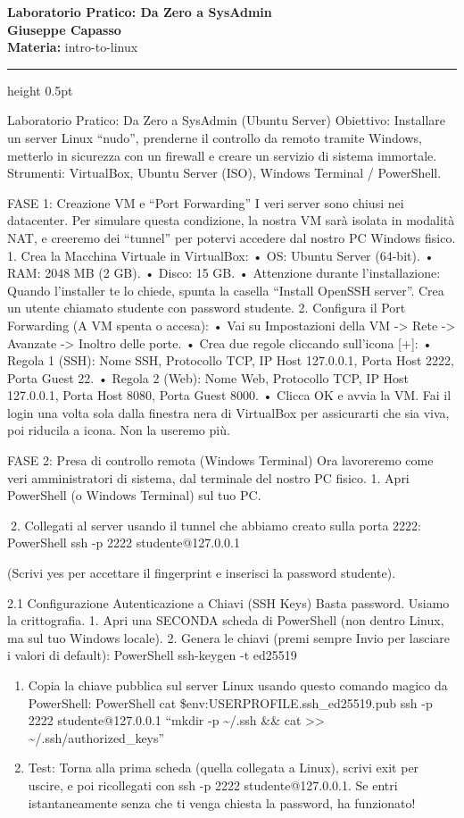 \documentclass[11pt,a4paper]{article}
\newcommand{\proposaltitle}[1]{
    \begin{center}
        \vspace*{0.1cm}
        {\LARGE \bfseries \color{blue} #1} \\[1.5ex]
        {\large \textbf{Giuseppe Capasso}} \\[1ex]
                \small{
            \vspace{0.1cm}
            \textbf{Materia:} intro-to-linux\\
        }
            \end{center}
    \vspace{0.3cm}
    \hrule height 0.5pt
    \vspace{0.5cm}
}
\begin{document}
\proposaltitle{Laboratorio Pratico: Da Zero a SysAdmin}

Laboratorio Pratico: Da Zero a SysAdmin (Ubuntu Server) Obiettivo:
Installare un server Linux ``nudo'', prenderne il controllo da remoto
tramite Windows, metterlo in sicurezza con un firewall e creare un
servizio di sistema immortale. Strumenti: VirtualBox, Ubuntu Server
(ISO), Windows Terminal / PowerShell.

FASE 1: Creazione VM e ``Port Forwarding'' I veri server sono chiusi nei
datacenter. Per simulare questa condizione, la nostra VM sarà isolata in
modalità NAT, e creeremo dei ``tunnel'' per potervi accedere dal nostro
PC Windows fisico. 1. Crea la Macchina Virtuale in VirtualBox: • OS:
Ubuntu Server (64-bit). • RAM: 2048 MB (2 GB). • Disco: 15 GB. •
Attenzione durante l'installazione: Quando l'installer te lo chiede,
spunta la casella ``Install OpenSSH server''. Crea un utente chiamato
studente con password studente. 2. Configura il Port Forwarding (A VM
spenta o accesa): • Vai su Impostazioni della VM -\textgreater{} Rete
-\textgreater{} Avanzate -\textgreater{} Inoltro delle porte. • Crea due
regole cliccando sull'icona {[}+{]}: • Regola 1 (SSH): Nome SSH,
Protocollo TCP, IP Host 127.0.0.1, Porta Host 2222, Porta Guest 22. •
Regola 2 (Web): Nome Web, Protocollo TCP, IP Host 127.0.0.1, Porta Host
8080, Porta Guest 8000. • Clicca OK e avvia la VM. Fai il login una
volta sola dalla finestra nera di VirtualBox per assicurarti che sia
viva, poi riducila a icona. Non la useremo più.

FASE 2: Presa di controllo remota (Windows Terminal) Ora lavoreremo come
veri amministratori di sistema, dal terminale del nostro PC fisico. 1.
Apri PowerShell (o Windows Terminal) sul tuo PC.

2. Collegati al server usando il tunnel che abbiamo creato sulla porta
2222: PowerShell ssh -p 2222 studente@127.0.0.1

(Scrivi yes per accettare il fingerprint e inserisci la password
studente).

2.1 Configurazione Autenticazione a Chiavi (SSH Keys) Basta password.
Usiamo la crittografia. 1. Apri una SECONDA scheda di PowerShell (non
dentro Linux, ma sul tuo Windows locale). 2. Genera le chiavi (premi
sempre Invio per lasciare i valori di default): PowerShell ssh-keygen -t
ed25519

\begin{enumerate}
\def\labelenumi{\arabic{enumi}.}
\setcounter{enumi}{2}
\item
  Copia la chiave pubblica sul server Linux usando questo comando magico
  da PowerShell: PowerShell cat \$env:USERPROFILE.ssh\id\_ed25519.pub
  \textbar{} ssh -p 2222 studente@127.0.0.1 ``mkdir -p
  \textasciitilde/.ssh \&\& cat \textgreater\textgreater{}
  \textasciitilde/.ssh/authorized\_keys''
\item
  Test: Torna alla prima scheda (quella collegata a Linux), scrivi exit
  per uscire, e poi ricollegati con ssh -p 2222 studente@127.0.0.1. Se
  entri istantaneamente senza che ti venga chiesta la password, ha
  funzionato!
\end{enumerate}
\end{document}
